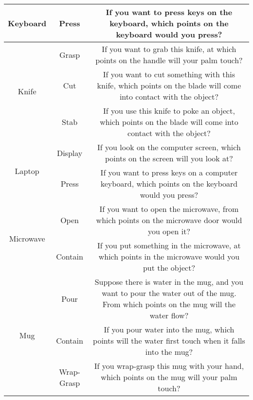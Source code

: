 \documentclass[final]{cvpr}
\begin{document}
\begin{table*}[t]
{\begin{tabular}{c|c|c}
    Keyboard                          & Press               & If you want to press keys on the keyboard, which points on the keyboard would you press?                                                         \\ \hline
    \multirow{3}{*}{Knife}            & Grasp               & If you want to grab this knife, at which points on the handle will your palm touch?                                                              \\
                                      & Cut                 & If you want to cut something with this knife, which points on the blade will come into contact with the object?                                  \\
                                      & Stab                & If you use this knife to poke an object, which points on the blade will come into contact with the object?                                       \\ \hline
    \multirow{2}{*}{Laptop}           & Display             & If you look on the computer screen, which points on the screen will you look at?                                                                 \\
                                      & Press               & If you want to press keys on a computer keyboard, which points on the keyboard would you press?                                                  \\ \hline
    \multirow{2}{*}{Microwave}        & Open                & If you want to open the microwave, from which points on the microwave door would you open it?                                                    \\
                                      & Contain             & If you put something in the microwave, at which points in the microwave would you put the object?                                                \\ \hline
    \multirow{4}{*}{Mug}              & Pour                & Suppose there is water in the mug, and you want to pour the water out of the mug. From which points on the mug will the water flow?              \\
                                      & Contain             & If you pour water into the mug, which points will the water first touch when it falls into the mug?                                              \\
                                      & Wrap-Grasp          & If you wrap-grasp this mug with your hand, which points on the mug will your palm touch?                                                         \\

\end{tabular}}
\end{table*}
\end{document}
